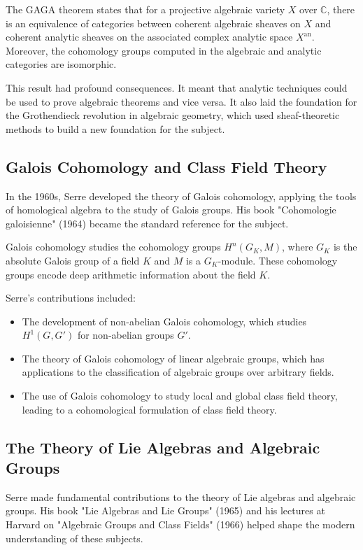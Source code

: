 The GAGA theorem states that for a projective algebraic variety $X$ over $\mathbb{C}$, there is an equivalence of categories between coherent algebraic sheaves on $X$ and coherent analytic sheaves on the associated complex analytic space $X^{\mathrm{an}}$. Moreover, the cohomology groups computed in the algebraic and analytic categories are isomorphic.

This result had profound consequences. It meant that analytic techniques could be used to prove algebraic theorems and vice versa. It also laid the foundation for the Grothendieck revolution in algebraic geometry, which used sheaf-theoretic methods to build a new foundation for the subject.

\subsection{Galois Cohomology and Class Field Theory}

In the 1960s, Serre developed the theory of Galois cohomology, applying the tools of homological algebra to the study of Galois groups. His book "Cohomologie galoisienne" (1964) became the standard reference for the subject.

Galois cohomology studies the cohomology groups $H^n(G_K, M)$, where $G_K$ is the absolute Galois group of a field $K$ and $M$ is a $G_K$-module. These cohomology groups encode deep arithmetic information about the field $K$.

Serre's contributions included:
\begin{itemize}
\item The development of non-abelian Galois cohomology, which studies $H^1(G, G')$ for non-abelian groups $G'$.
\item The theory of Galois cohomology of linear algebraic groups, which has applications to the classification of algebraic groups over arbitrary fields.
\item The use of Galois cohomology to study local and global class field theory, leading to a cohomological formulation of class field theory.
\end{itemize}

\subsection{The Theory of Lie Algebras and Algebraic Groups}

Serre made fundamental contributions to the theory of Lie algebras and algebraic groups. His book "Lie Algebras and Lie Groups" (1965) and his lectures at Harvard on "Algebraic Groups and Class Fields" (1966) helped shape the modern understanding of these subjects.

